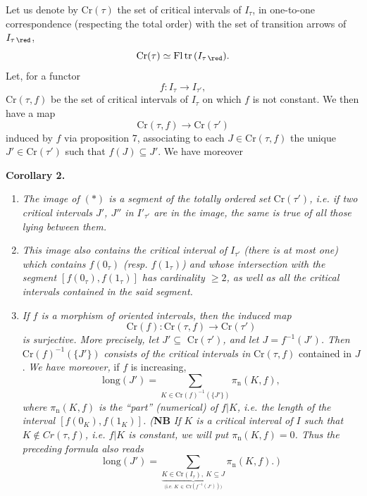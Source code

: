 Let us denote by $\mathrm{Cr}(\tau)$ the set of critical intervals of $I_\tau$, in one-to-one correspondence (respecting the total order) with the set of transition arrows of $I_{\tau\,\red}$, %
\[
\mathrm{Cr}(\tau)\simeq\mathrm{Fl}\,\mathrm{tr}\,(I_{\tau\,\red}).
\]
Let, for a functor
\[
f : I_\tau\longrightarrow I_{\tau'},
\]
$\mathrm{Cr}(\tau,f)$ be the set of critical intervals of $I_\tau$ on which $f$ is not constant. We then have a map
\[
\mathrm{Cr}(\tau,f)\longrightarrow\mathrm{Cr}(\tau') \tag*{$(*)$} %
\]
induced by $f$ via proposition 7, associating to each $J\in\mathrm{Cr}(\tau,f)$ the unique $J'\in\mathrm{Cr}(\tau')$ such that $f(J)\subseteq J'$. We have moreover

\textbf{Corollary 2.}
\begin{enumerate}
\item[\textit{a)}] \textit{The image of $(*)$ is a segment of the totally ordered set} $\mathrm{Cr}(\tau')$\textit{, i.e. if two critical intervals $J'$, $J''$ in $I'_{\tau'}$ are in the image, the same is true of all} %
\textit{those lying between them.}
\item[\textit{b)}] \textit{This image also contains the critical interval of $I_{\tau'}$ (there is at most one) which contains $f(0_\tau)$ (resp. $f(1_\tau)$) and whose intersection with the segment $[f(0_\tau),f(1_\tau)]$ has cardinality $\geq 2$, as well as all the critical intervals contained in the said segment.}
\item[\textit{c)}] \textit{If $f$ is a morphism of oriented intervals, then the induced map}
\[
\mathrm{Cr}(f):\mathrm{Cr}(\tau,f)\longrightarrow\mathrm{Cr}(\tau')
\]
\textit{is surjective. More precisely, let $J'\subseteq$} $\mathrm{Cr}(\tau')$\textit{, and let $J=f^{-1}(J')$. Then} $\mathrm{Cr}(f)^{-1}(\{J'\})$ \textit{consists of the critical intervals in} $\mathrm{Cr}(\tau,f)$ contained in $J$. \textit{We have moreover,} if $f$ is increasing, %
\[
\mathrm{long}(J')=\sum_{K\in\mathrm{Cr}(f)^{-1}(\{J'\})}\pi_{\mathrm{n}}(K,f),
\]
\textit{where $\pi_{\mathrm{n}}(K,f)$ is the ``part'' (numerical) of $f|K$, i.e. the length of the interval $[f(0_K),f(1_K)]$. (}\textbf{NB} \textit{If $K$ is a critical interval of $I$ such that $K\notin Cr(\tau,f)$, i.e. $f|K$ is constant, we will put $\pi_{\mathrm{n}}(K,f)=0$. Thus the preceding formula also reads}
\[
\mathrm{long}(J')=\sum\limits_{\underbrace{K\in\mathrm{Cr}(I_\tau),\ K\subseteq J}_{\text{(i.e. }K\,\in\,\mathrm{Cr}(f^{-1}(J'))\text{)}}}\pi_{\mathrm{n}}(K,f).\ \textit{)}
\]
\end{enumerate}